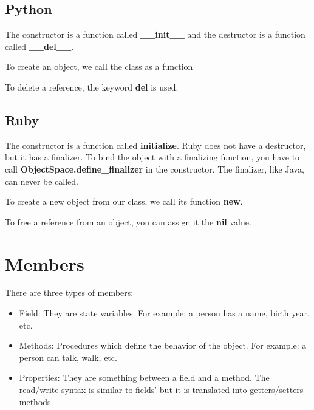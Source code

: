 \documentclass{KodeBook}
\begin{document}


\subsection{Python}

The constructor is a function called \textbf{\_\_init\_\_} and the destructor is a function called \textbf{\_\_del\_\_}.



To create an object, we call the class as a function



To delete a reference, the keyword \textbf{del} is used.




\subsection{Ruby}

The constructor is a function called \textbf{initialize}.
Ruby does not have a destructor, but it has a finalizer.
To bind the object with a finalizing function, you have to call \textbf{ObjectSpace.define\_finalizer} in the constructor.
The finalizer, like Java, can never be called.



To create a new object from our class, we call its function \textbf{new}.



To free a reference from an object, you can assign it the \textbf{nil} value.



\section{Members}

There are three types of members: 
\begin{itemize}
	\item Field: They are state variables. For example: a person has a name, birth year, etc.
	\item Methods: Procedures which define the behavior of the object. For example: a person can talk, walk, etc.
	\item Properties: They are something between a field and a method. The read/write syntax is similar to fields' but it is translated into getters/setters methods.
\end{itemize}
\end{document}
